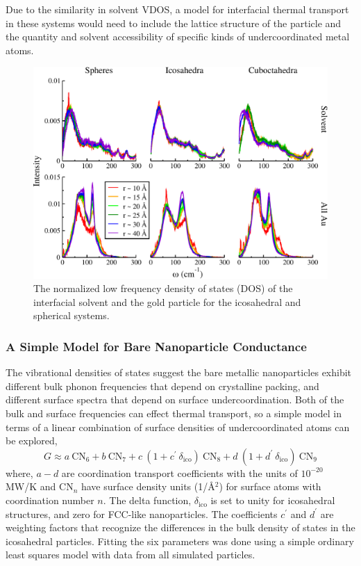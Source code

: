 Due to the similarity in solvent VDOS, a model for interfacial 
thermal transport in these
systems would need to include the lattice structure of the particle
and the quantity and solvent accessibility of specific kinds of
undercoordinated metal atoms.

\begin{figure}[!htb]
        \includegraphics[width=5in]{figures/all-spect.pdf}
        \caption{The normalized low frequency density of states (DOS)
          of the interfacial solvent and the gold particle for the
          icosahedral and spherical systems. }
        \label{fig:all-spect}
\end{figure}

\subsubsection{A Simple Model for Bare Nanoparticle Conductance}
The vibrational densities of states suggest the bare metallic
nanoparticles exhibit different bulk phonon frequencies that depend on
crystalline packing, and different surface spectra that depend on
surface undercoordination.  Both of the bulk and surface frequencies
can effect thermal transport, so a simple model in terms of a linear 
combination of surface densities of undercoordinated atoms can be explored,
\begin{equation}
G \approx a~\mathrm{CN}_{6} + b~\mathrm{CN}_{7} + c~\left(1+c^{\prime}~\delta_\mathrm{ico}\right)~\mathrm{CN}_{8} + d~\left( 1 + d^{\prime}~\delta_\mathrm{ico} \right)~\mathrm{CN}_{9}
\label{eq:lin-fit}
\end{equation}
where, $a - d$ are coordination transport coefficients with the units
of $10^{-20}$ MW/K and $\mathrm{CN}_{n}$ have surface density units
(1/\AA $^2$) for surface atoms with coordination number $n$.  The
delta function, $\delta_\mathrm{ico}$ is set to unity for icosahedral
structures, and zero for FCC-like nanoparticles.  The coefficients
$c^{\prime}$ and $d^{\prime}$ are weighting factors that recognize the
differences in the bulk density of states in the icosahedral
particles.  Fitting the six parameters was done using a simple
ordinary least squares model with data from all simulated particles.

